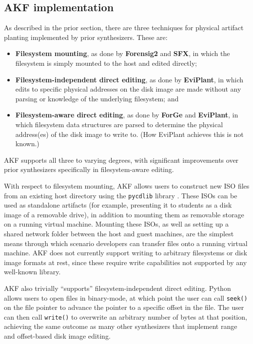 \documentclass[letterpaper,12pt]{report}
\def\tightlist{}
\newcommand{\passthrough}[1]{#1}
\begin{document}
\subsection{AKF implementation}\label{akf-implementation}

As described in the prior section, there are three techniques for
physical artifact planting implemented by prior synthesizers. These are:

\begin{itemize}
\tightlist
\item
  \textbf{Filesystem mounting}, as done by \textbf{Forensig2} and
  \textbf{SFX}, in which the filesystem is simply mounted to the host
  and edited directly;
\item
  \textbf{Filesystem-independent direct editing}, as done by
  \textbf{EviPlant}, in which edits to specific physical addresses on
  the disk image are made without any parsing or knowledge of the
  underlying filesystem; and
\item
  \textbf{Filesystem-aware direct editing}, as done by \textbf{ForGe}
  and \textbf{EviPlant}, in which filesystem data structures are parsed
  to determine the physical address(es) of the disk image to write to.
  (How EviPlant achieves this is not known.)
\end{itemize}

AKF supports all three to varying degrees, with significant improvements
over prior synthesizers specifically in filesystem-aware editing.

With respect to filesystem mounting, AKF allows users to construct new
ISO files from an existing host directory using the
\passthrough{\lstinline!pycdlib!} library
\cite{lalancetteClalancettePycdlib2025}. These ISOs can be used as
standalone artifacts (for example, presenting it to students as a disk
image of a removable drive), in addition to mounting them as removable
storage on a running virtual machine. Mounting these ISOs, as well as
setting up a shared network folder between the host and guest machines,
are the simplest means through which scenario developers can transfer
files onto a running virtual machine. AKF does not currently support
writing to arbitrary filesystems or disk image formats at rest, since
these require write capabilities not supported by any well-known
library.

AKF also trivially ``supports'' filesystem-independent direct editing.
Python allows users to open files in binary-mode, at which point the
user can call \passthrough{\lstinline!seek()!} on the file pointer to
advance the pointer to a specific offset in the file. The user can then
call \passthrough{\lstinline!write()!} to overwrite an arbitrary number
of bytes at that position, achieving the same outcome as many other
synthesizers that implement range and offset-based disk image editing.
\end{document}
